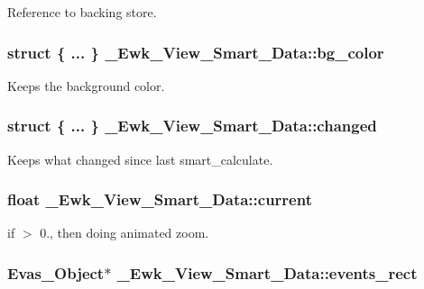 Reference to backing store. \hypertarget{struct__Ewk__View__Smart__Data_a00227832f5b66cbda1eedca592e8f39b}{
\subsubsection[{bg\+\_\+color}]{\setlength{\rightskip}{0pt plus 5cm}struct \{ ... \}   \+\_\+\+Ewk\+\_\+\+View\+\_\+\+Smart\+\_\+\+Data\+::bg\+\_\+color}}\label{struct__Ewk__View__Smart__Data_a00227832f5b66cbda1eedca592e8f39b}
Keeps the background color. \hypertarget{struct__Ewk__View__Smart__Data_a7b726de0838fc39f50348edae9f3cbcc}{
\subsubsection[{changed}]{\setlength{\rightskip}{0pt plus 5cm}struct \{ ... \}   \+\_\+\+Ewk\+\_\+\+View\+\_\+\+Smart\+\_\+\+Data\+::changed}}\label{struct__Ewk__View__Smart__Data_a7b726de0838fc39f50348edae9f3cbcc}
Keeps what changed since last smart\+\_\+calculate. \hypertarget{struct__Ewk__View__Smart__Data_a6a5ebb717cfd05649bb863ae198af5b0}{
\subsubsection[{current}]{\setlength{\rightskip}{0pt plus 5cm}float \+\_\+\+Ewk\+\_\+\+View\+\_\+\+Smart\+\_\+\+Data\+::current}}\label{struct__Ewk__View__Smart__Data_a6a5ebb717cfd05649bb863ae198af5b0}
if $>$ 0., then doing animated zoom. \hypertarget{struct__Ewk__View__Smart__Data_a4a32abf5d0a7d0eb69a80cf089b8d374}{
\subsubsection[{events\+\_\+rect}]{\setlength{\rightskip}{0pt plus 5cm}Evas\+\_\+\+Object$\ast$ \+\_\+\+Ewk\+\_\+\+View\+\_\+\+Smart\+\_\+\+Data\+::events\+\_\+rect}}\label{struct__Ewk__View__Smart__Data_a4a32abf5d0a7d0eb69a80cf089b8d374}

